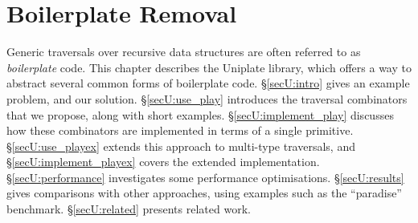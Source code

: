 


\begin{comment}
\begin{code}
class Uniplate x where
	uniplate :: x -> ([x], [x] -> x)
\end{code}
\begin{code}
class Uniplate x where
\end{code}
\begin{code}
transform' x = transform x
\end{code}
\begin{code}
children = undefined
context = undefined
\end{code}
\end{comment}


\chapter{Boilerplate Removal}
\label{chp:uniplate}


Generic traversals over recursive data structures are often referred to as \textit{boilerplate} code. This chapter describes the Uniplate library, which offers a way to abstract several common forms of boilerplate code. \S\ref{secU:intro} gives an example problem, and our solution. \S\ref{secU:use_play} introduces the traversal combinators that we propose, along with short examples. \S\ref{secU:implement_play} discusses how these combinators are implemented in terms of a single primitive. \S\ref{secU:use_playex} extends this approach to multi-type traversals, and \S\ref{secU:implement_playex} covers the extended implementation. \S\ref{secU:performance} investigates some performance optimisations. \S\ref{secU:results} gives comparisons with other approaches, using examples such as the ``paradise'' benchmark. \S\ref{secU:related} presents related work.


